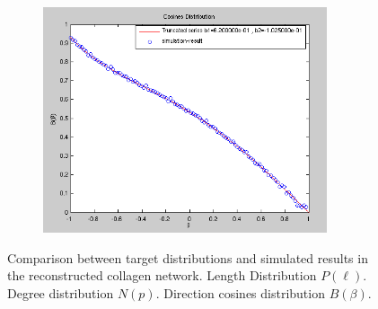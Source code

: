 \begin{figure}[h!]
\begin{subfigure}{0.32\textwidth}
    \includegraphics[width=0.92\textwidth]{Figures/chapter-reconstruct/cosinesN10000.png}%
    \label{collagen_cosines}
  \end{subfigure}

\caption[Collagen: comparing target and simulated distributions]{ Comparison
between target distributions and simulated results in the reconstructed collagen
network.
 Length Distribution $P(\ell)$.
 Degree distribution $N(p)$.
 Direction cosines distribution $B(\beta)$.
}
\label{fig:collagen-distributions}
\end{figure}

%
%
%
